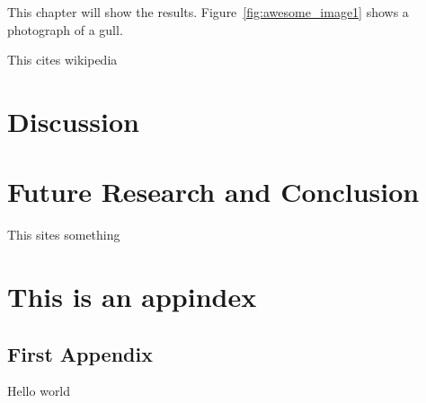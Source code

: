 \documentclass[11pt,twoside,a4paper]{report}
\begin{document}
This chapter will show the results. Figure~\ref{fig:awesome_image1} shows a photograph of a gull.

This \cite{wiki:123} cites wikipedia
\chapter{Discussion}

\chapter{Future Research and Conclusion}
This \cite{amanatides1987fast} sites something




\listoffigures
\listoftables
\appendix
\chapter{This is an appindex}
\section{First Appendix}
Hello world
\end{document}
